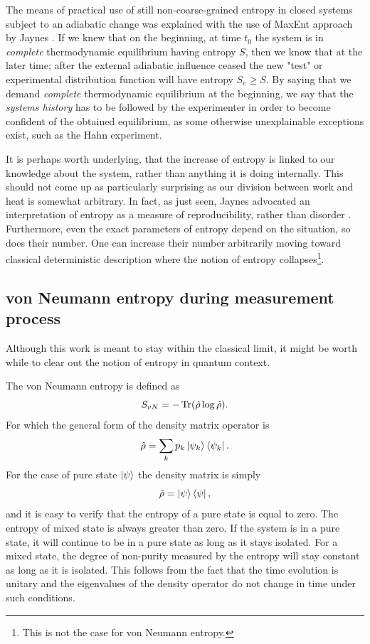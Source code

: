 \documentclass[a4paper,12pt]{article}
\begin{document}
The means of practical use of still non-coarse-grained entropy in closed systems subject to an adiabatic change was explained with the use of MaxEnt approach by Jaynes \cite{Jaynes:1965gg}. If we knew that on the beginning, at time $t_0$ the system is in \textit{complete} thermodynamic equilibrium having entropy $S$, then we know that at the later time; after the external adiabatic influence ceased the new "test" or experimental distribution function will have entropy $S_e \geq S$. By saying that we demand \textit{complete} thermodynamic equilibrium at the beginning, we say that the \textit{systems history} has to be followed by the experimenter in order to become confident of the obtained equilibrium, as some otherwise unexplainable exceptions exist, such as the Hahn experiment. %

It is perhaps worth underlying, that the increase of entropy is linked to our knowledge about the system, rather than anything it is doing internally. This should not come up as particularly surprising as our division between work and heat is somewhat arbitrary. In fact, as just seen, Jaynes advocated an interpretation of entropy as a measure of reproducibility, rather than disorder \cite{Jaynes:1957zz}.
Furthermore, even the exact parameters of entropy depend on the situation, so does their number. One can increase their number arbitrarily moving toward classical deterministic description where the notion of entropy collapses\footnote{This is not the case for von Neumann entropy.}.

\subsection{von Neumann entropy during measurement process}

Although this work is meant to stay within the classical limit, it might be worth while to clear out the notion of entropy in quantum context.

The von Neumann entropy is defined as 
\begin{equation}
  S_{vN}= -\Tr(\hat{\rho} \log{\hat{\rho}}).
\end{equation}
For which the general form of the density matrix operator is
\begin{equation}
	\hat{\rho}=\sum_k p_k \ket{\psi_k}\bra{\psi_k} .
\end{equation}
For the case of pure state $\ket{\psi}$ the density matrix is simply
\begin{equation}
  \hat{\rho} = \ket{\psi}\bra{\psi},
\end{equation}
and it is easy to verify that the entropy of a pure state is equal to zero. The entropy of mixed state is always greater than zero.
If the system is in a pure state, it will continue to be in a pure state as long as it stays isolated. For a mixed state, the degree of non-purity measured by the entropy will stay constant as long as it is isolated. This follows from the fact that the time evolution is unitary and the eigenvalues of the density operator do not change in time under such conditions.
\end{document}

